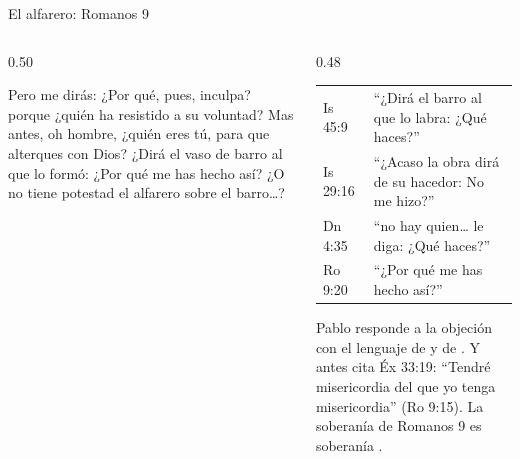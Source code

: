 \begin{frame}{El alfarero: Romanos 9}
\begin{columns}[t,onlytextwidth]
\begin{column}{0.50\textwidth}
\begin{cita}Pero me dirás: ¿Por qué, pues, inculpa? porque ¿quién ha resistido a su voluntad? Mas antes, oh hombre, ¿quién eres tú, para que alterques con Dios? ¿Dirá el vaso de barro al que lo formó: ¿Por qué me has hecho así? ¿O no tiene potestad el alfarero sobre el barro\ldots?\end{cita}
\end{column}
\begin{column}{0.48\textwidth}
\scriptsize\renewcommand{\arraystretch}{1.15}
\begin{tabular}{@{}>{\RaggedRight\arraybackslash}p{1.4cm}>{\RaggedRight\arraybackslash}p{4.2cm}@{}}
\toprule
Is 45:9 & ``¿Dirá el barro al que lo labra: ¿Qué haces?'' \\
Is 29:16 & ``¿Acaso la obra dirá de su hacedor: No me hizo?'' \\
Dn 4:35 & ``no hay quien\ldots{} le diga: ¿Qué haces?'' \\
Ro 9:20 & ``¿Por qué me has hecho así?'' \\
\bottomrule
\end{tabular}\par\smallskip
\small Pablo responde a la objeción con el lenguaje de  y de . Y antes cita Éx 33:19: ``Tendré misericordia del que yo tenga misericordia'' (Ro 9:15). La soberanía de Romanos 9 es soberanía .
\end{column}
\end{columns}\par\smallskip
{}
\end{frame}

